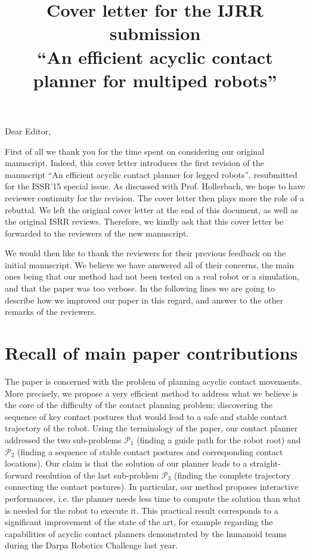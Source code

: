 \documentclass[a4paper]{article}
\author {}
\title {Cover letter for the IJRR submission \\ ``An efficient acyclic contact planner for multiped robots''}
\date {}
\begin{document}
\maketitle

Dear Editor, \medskip

First of all we thank you for the time spent on considering our original manuscript. Indeed,
this cover letter introduces the first revision of the manuscript ``An efficient acyclic contact planner for legged robots'', resubmitted for the ISSR'15 special issue.
As discussed with Prof. Hollerbach, we hope to have reviewer continuity for the revision.
The cover letter then plays more the role of a rebuttal. We left the original cover letter at the end of this document, as well as the original ISRR reviews.
Therefore, we kindly ask that this cover letter be forwarded to the reviewers of the new manuscript.

We would then like to thank the reviewers for their previous feedback on the initial manuscript. We believe we have answered
all of their concerns, the main ones being that our method had not been tested on a real robot or a simulation, and that the paper was too verbose.
In the following lines we are going to describe how we improved our paper in this regard, and answer to the other remarks of the reviewers.

\section{Recall of main paper contributions}
The paper is concerned with the problem of planning acyclic contact movements. 
More precisely, we propose a very efficient method to address what we believe is the core of the difficulty of the contact planning problem: discovering the sequence of key contact postures that would lead to a safe and stable contact trajectory of the robot. 
Using the terminology of the paper, our contact planner addressed the two sub-problems $\mathcal{P}_1$ (finding a guide path for the robot root) and $\mathcal{P}_2$ (finding a sequence of stable contact postures and corresponding contact locations).
Our claim is that the solution of our planner leads to a straight-forward resolution of the last sub-problem $\mathcal{P}_3$ (finding the complete trajectory connecting the contact postures).
In particular, our method proposes interactive performances, i.e. the planner needs less time to compute the solution than what is needed for the robot to execute it.
This practical result corresponds to a significant improvement of the state of the art, for example regarding the capabilities of acyclic contact planners demonstrated by the humanoid teams during the Darpa Robotics Challenge last year.
\end{document}
